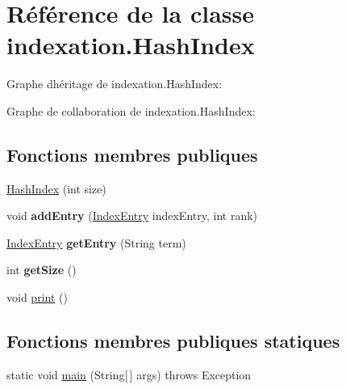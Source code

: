 \hypertarget{classindexation_1_1HashIndex}{}\section{Référence de la classe indexation.\+Hash\+Index}
\label{classindexation_1_1HashIndex}


Graphe d\textquotesingle{}héritage de indexation.\+Hash\+Index\+:


Graphe de collaboration de indexation.\+Hash\+Index\+:
\subsection*{Fonctions membres publiques}
\begin{DoxyCompactItemize}
\item 
\hyperlink{classindexation_1_1HashIndex_ac1dd959e3bd9e910f7c98cccc7782993}{Hash\+Index} (int size)
\item 
\mbox{\label{classindexation_1_1HashIndex_af8f15848062d6df2a416f2f39e804cca}} 
void {\bfseries add\+Entry} (\hyperlink{classindexation_1_1content_1_1IndexEntry}{Index\+Entry} index\+Entry, int rank)
\item 
\mbox{\label{classindexation_1_1HashIndex_a323b1de9297c5c66c3254f7c8804eca1}} 
\hyperlink{classindexation_1_1content_1_1IndexEntry}{Index\+Entry} {\bfseries get\+Entry} (String term)
\item 
\mbox{\label{classindexation_1_1HashIndex_af7fb6bf6fec593896dd524cbc78acc93}} 
int {\bfseries get\+Size} ()
\item 
void \hyperlink{classindexation_1_1HashIndex_a759834eb6bae4e2ab1d37ddb2f1aa840}{print} ()
\end{DoxyCompactItemize}
\subsection*{Fonctions membres publiques statiques}
\begin{DoxyCompactItemize}
\item 
static void \hyperlink{classindexation_1_1HashIndex_aaaa8220dffaf3d4a5a77e0bccfd2fccd}{main} (String\mbox{[}$\,$\mbox{]} args)  throws Exception  	
\end{DoxyCompactItemize}


